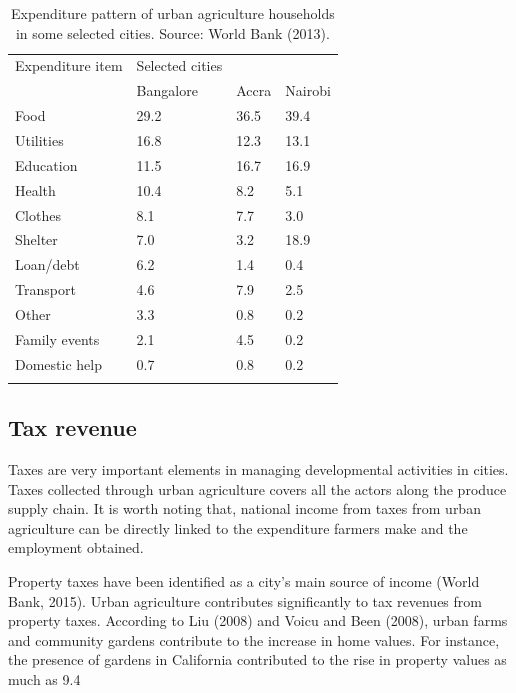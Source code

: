 \begin{table}[th]
\caption{Expenditure pattern of urban agriculture households in some selected cities. Source: World Bank (2013).}
\begin{center}
\begin{tabular}{ p{} p{} p{} p{} } 
\hline
Expenditure item & Selected cities &  &  \\
  & Bangalore & Accra & Nairobi \\
\hline
Food & 29.2 & 36.5 & 39.4 \\
Utilities & 16.8 & 12.3 & 13.1 \\
Education & 11.5 & 16.7 & 16.9 \\
Health & 10.4 & 8.2 & 5.1 \\
Clothes & 8.1 & 7.7 & 3.0 \\
Shelter & 7.0 & 3.2 & 18.9 \\
Loan/debt & 6.2 & 1.4 & 0.4 \\
Transport & 4.6 & 7.9 & 2.5 \\
Other & 3.3 & 0.8 & 0.2 \\
Family events & 2.1 & 4.5 & 0.2 \\
Domestic help & 0.7 & 0.8 & 0.2 \\
\hline
\label{tbl:expenditurePattern}
\end{tabular}
\end{center}
\end{table}

\subsection{Tax revenue}

Taxes are very important elements in managing developmental activities in cities. Taxes collected through urban agriculture covers all the actors along the produce supply chain. It is worth noting that, national income from taxes from urban agriculture can be directly linked to the expenditure farmers make and the employment obtained.

Property taxes have been identified as a city's main source of income (World Bank, 2015). Urban agriculture contributes significantly to tax revenues from property taxes. According to Liu (2008) and Voicu and Been (2008), urban farms and community gardens contribute to the increase in home values. For instance, the presence of gardens in California contributed to the rise in property values as much as 9.4%

